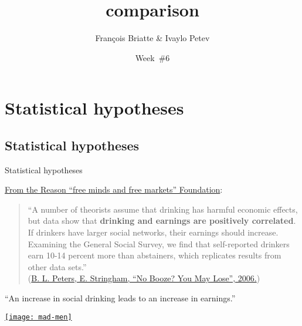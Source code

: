 \documentclass[t]{beamer}
\title{comparison}
\author{François Briatte \& Ivaylo Petev}
\date{Week~\#6}
\begin{document}

	\section{Statistical hypotheses}

	\subsection{Statistical hypotheses}

	\begin{frame}[t]{Statistical hypotheses}
		
		\href{http://reason.org/}{From the Reason ``free minds and free markets'' Foundation}:\\[1em]

		\begin{quote}
		``A number of theorists assume that drinking has harmful economic effects, but data show that \textbf{drinking and earnings are positively correlated}. \textbf{} If drinkers have larger social networks, their earnings should increase. Examining the General Social Survey, we find that self-reported drinkers earn 10-14 percent more than abstainers, which replicates results from other data sets.''\\[1em]
		
		(\href{http://reason.org/news/show/127594.html}{B. L. Peters, E. Stringham, ``No Booze? You May Lose'', 2006.})
		\end{quote}

		 ``An increase in social drinking leads to an increase in earnings.''
	\end{frame}

  \begin{frame}[plain, c]{}

		\begin{center}
			\href{http://www.phdcomics.com/comics.php?f=1563}{\texttt{[image: mad-men]}}
    \end{center}
		  
  \end{frame}
	
\end{document}
